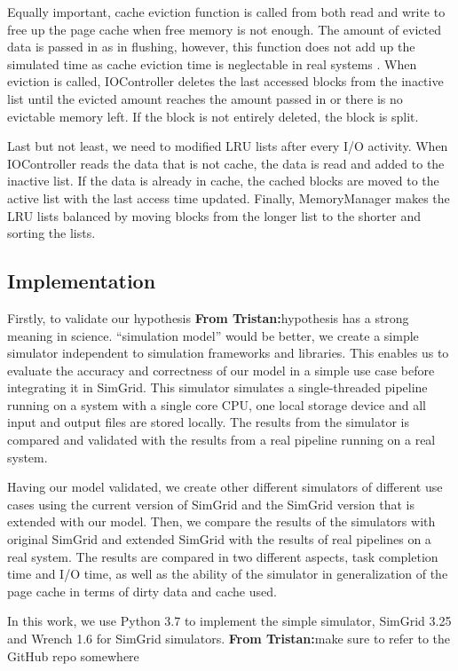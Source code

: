 \documentclass[conference]{IEEEtran}
\newcommand{\tristan}[1]{\color{orange}\textbf{From Tristan:}#1\color{black}}
\begin{document}
			Equally important, cache eviction function is called from both read and write to free up the page cache when free memory is not enough. The amount of evicted data is passed in as in flushing, however, this function does not add up the simulated time as cache eviction time is neglectable in real systems . When eviction is called, IOController deletes the last accessed blocks from the inactive list until the evicted amount reaches the amount passed in or there is no evictable memory left. If the block is not entirely deleted, the block is split.
			
			Last but not least, we need to modified LRU lists after every I/O activity. When IOController reads the data that is not cache, the data is read and added to the inactive list. If the data is already in cache, the cached blocks are moved to the active list with the last access time updated. Finally, MemoryManager makes the LRU lists balanced by moving blocks from the longer list to the shorter and sorting the lists.
			
		\subsection{Implementation}

			Firstly, to validate our hypothesis \tristan{hypothesis has a
			strong meaning in science. ``simulation model'' would be
			better}, we create a simple simulator independent to simulation
			frameworks and libraries. This enables us to evaluate the
			accuracy and correctness of our model in a simple use case
			before integrating it in SimGrid. This simulator simulates a
			single-threaded pipeline running on a system with a single core
			CPU, one local storage device and all input and output files
			are stored locally. The results from the simulator is compared
			and validated with the results from a real pipeline running on
			a real system.
			
			Having our model validated, we create other different
			simulators of different use cases using the current version of
			SimGrid and the SimGrid version that is extended with our
			model. Then, we compare the results of the simulators with
			original SimGrid and extended SimGrid with the results of real
			pipelines on a real system. The results are compared in two
			different aspects, task completion time and I/O time, as well
			as the ability of the simulator in generalization of the page
			cache in terms of dirty data and cache used.
		
			In this work, we use Python 3.7 to implement the simple
			simulator, SimGrid 3.25 and Wrench 1.6 for SimGrid simulators. \tristan{make sure to refer to the GitHub repo somewhere}
			
\end{document}
